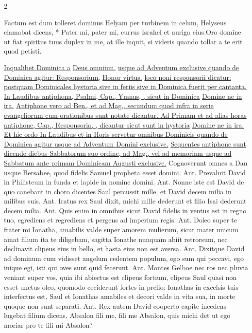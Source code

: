 \begin{multicols*}{2}
\begin{responsory-doxology}
{Factum est dum tolleret dominus Helyam per turbinem in celum, Helyseus clamabat dicens, * Pater mi, pater mi, currus Israhel et auriga eius.}{Oro domine ut fiat spiritus tuus duplex in me, at ille inquit, si videris quando tollar a te erit quod petisti.}
\end{responsory-doxology}%
\newline \ul{Inqualibet Dominica a} \hyperlink{deus-omnium}{Deus omnium.} \ul{usque ad Adventum exclusive quando de Dominica agitur: Responsorium,} \hyperlink{honor-virtus}{Honor virtus.} \ul{loco noni responsorii dicatur: postquam Dominicales hystoria sive in feriis sive in Dominica fuerit per cantanta. In Laudibus antiphona, Psalmi, Cap., Ymnus, \Vbar , sicut in Dominica} \hyperlink{domine-ne-in-ira}{Domine ne in ira.} \ul{Antiphone vero ad Ben., et ad Mag., secundum quod infra in serie evangeliorum cum orationibus sunt notate dicantur. Ad Primam et ad alias horas antiphone, Cap., Responsoria, \Vbar , dicantur sicut sunt in hystoria} \hyperlink{domine-ne-in-ira}{Domine ne in ira.} \ul{Et hic ordo In Laudibus et in Horis servetur omnibus Dominicis quando de Dominica agitur usque ad Adventum Domini exclusive.}%
\newline \ul{Sequentes antiphone sunt dicende diebus Sabbatorum suo ordine, ad Mag., vel ad memoriam usque ad Sabbatum ante primam Dominicam Augusti exclusive.}
 Cognoverunt omnes a Dan usque Bersabee, quod fidelis Samuel propheta esset domini. {\color{Red} Ant.} Prevaluit David in Philisteum in funda et lapide in nomine domini. {\color{Red} Ant.} Nonne iste est David de quo canebant in choro dicentes Saul percussit mille, et David decem milia in milibus suis. {\color{Red} Ant.} Iratus rex Saul dixit, michi mille dederunt et filio Isai dederunt decem milia. {\color{Red} Ant.} Quis enim in omnibus sicut David fidelis in ventus est in regno tuo, egrediens et regrediens et pergens ad imperium regis. {\color{Red} Ant.} Doleo super te frater mi Ionatha, amabilis valde super amorem mulierum, sicut mater unicum amat filium ita te diligebam, sagitta Ionathe nunquam abiit retrorsum, nec declinavit clipeus eius in bello, et hasta eius non est aversa. {\color{Red} Ant.} Dixitque David ad dominum cum vidisset angelum cedentem populum, ego sum qui peccavi, ego inique egi, isti qui oves sunt quid fecerunt. {\color{Red} Ant.} Montes Gelboe nec ros nec pluvia veniant super vos, quia ibi abiectus est clipeus fortium, clipeus Saul quasi non esset unctus oleo, quomodo ceciderunt fortes in prelio: Ionathas in excelsis tuis interfectus est, Saul et Ionathas amabiles et decori valde in vita sua, in morte quoque non sunt separati. {\color{Red} Ant.} Rex autem David cooperto capite incedens lugebat filium dicens, Absalon fili me, fili me Absalon, quis michi det ut ego moriar pro te fili mi Absalon?

\end{multicols*}
